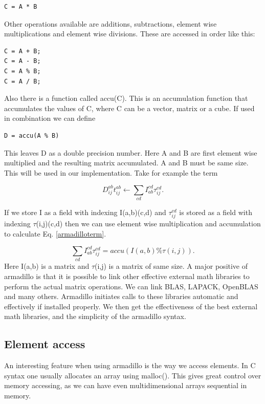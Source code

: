 \documentclass[a4paper,norsk,11pt,twoside]{report}
\begin{document}
\begin{lstlisting}
C = A * B 
\end{lstlisting}
Other operations available are additions, subtractions, element wise multiplications and element wise divisions. These are accessed in order like this:

\begin{lstlisting}
C = A + B;
C = A - B;
C = A % B;
C = A / B;
\end{lstlisting}
Also there is a function called accu(C). This is an accumulation function that accumulates the values of C, where C can be a vector, matrix or a cube. If used in combination we can define

\begin{lstlisting}
D = accu(A % B)
\end{lstlisting}
This leaves D as a double precision number. Here A and B are first element wise multiplied and the resulting matrix accumulated. A and B must be same size. This will be used in our implementation. Take for example the term

\begin{equation}
D_{ij}^{ab} t_{ij}^{ab} \leftarrow \sum_{cd} I_{ab}^{cd} \tau_{ij}^{cd} . \label{armadilloterm}
\end{equation}

If we store I as a field with indexing I(a,b)(c,d) and $\tau_{ij}^{cd}$ is stored as a field with indexing $\tau$(i,j)(c,d) then we can use element wise multiplication and accumulation to calculate Eq. \eqref{armadilloterm}.

\begin{equation}
\sum_{cd} I_{ab}^{cd} \tau_{ij}^{cd}
= accu(I(a,b) \% \tau(i,j)) .
\end{equation}
Here I(a,b) is a matrix and $\tau$(i,j) is a matrix of same size. A major positive of armadillo is that it is possible to link other effective external math libraries to perform the actual matrix operations. We can link BLAS, LAPACK, OpenBLAS and many others. Armadillo initiates calls to these libraries automatic and effectively if installed properly. We then get the effectiveness of the best external math libraries, and the simplicity of the armadillo syntax.

\subsection{Element access}
An interesting feature when using armadillo is the way we access elements. In C syntax one usually allocates an array using malloc(). This gives great control over memory accessing, as we can have even multidimensional arrays sequential in memory. \\
\end{document}
